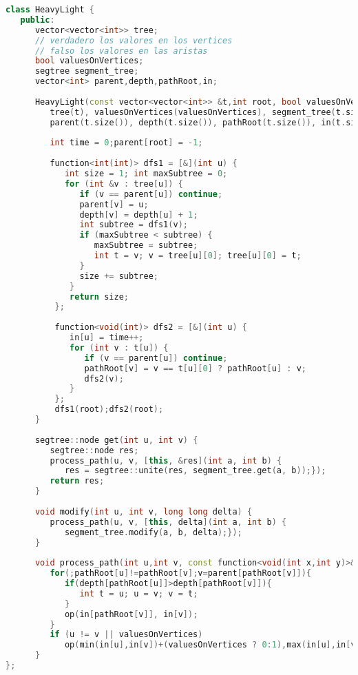 \begin{lstlisting}[language=C++]
class HeavyLight {
   public:
      vector<vector<int>> tree;
      // verdadero los valores en los vertices
      // falso los valores en las aristas
      bool valuesOnVertices; 
      segtree segment_tree;
      vector<int> parent,depth,pathRoot,in;
      
      HeavyLight(const vector<vector<int>> &t,int root, bool valuesOnVertices):
         tree(t), valuesOnVertices(valuesOnVertices), segment_tree(t.size()), 
         parent(t.size()), depth(t.size()), pathRoot(t.size()), in(t.size()){
         
         int time = 0;parent[root] = -1;
         
         function<int(int)> dfs1 = [&](int u) {
            int size = 1; int maxSubtree = 0;
            for (int &v : tree[u]) {
               if (v == parent[u]) continue;
               parent[v] = u;
               depth[v] = depth[u] + 1;
               int subtree = dfs1(v);
		       if (maxSubtree < subtree) {
                  maxSubtree = subtree;
                  int t = v; v = tree[u][0]; tree[u][0] = t;
               }
               size += subtree;
             }
             return size;
          };
		
          function<void(int)> dfs2 = [&](int u) {
             in[u] = time++;
             for (int v : t[u]) {
                if (v == parent[u]) continue;
                pathRoot[v] = v == t[u][0] ? pathRoot[u] : v;
                dfs2(v);
             }
          };
          dfs1(root);dfs2(root);
      }
      
      segtree::node get(int u, int v) {
         segtree::node res;
         process_path(u, v, [this, &res](int a, int b) {
            res = segtree::unite(res, segment_tree.get(a, b));});
         return res;
      }
	
      void modify(int u, int v, long long delta) {
         process_path(u, v, [this, delta](int a, int b) {
            segment_tree.modify(a, b, delta);});
      }
	
      void process_path(int u,int v, const function<void(int x,int y)>&op){
         for(;pathRoot[u]!=pathRoot[v];v=parent[pathRoot[v]]){
            if(depth[pathRoot[u]]>depth[pathRoot[v]]){
               int t = u; u = v; v = t;
            }
            op(in[pathRoot[v]], in[v]);
         }
         if (u != v || valuesOnVertices)
            op(min(in[u],in[v])+(valuesOnVertices ? 0:1),max(in[u],in[v]));
      }
};
\end{lstlisting}

